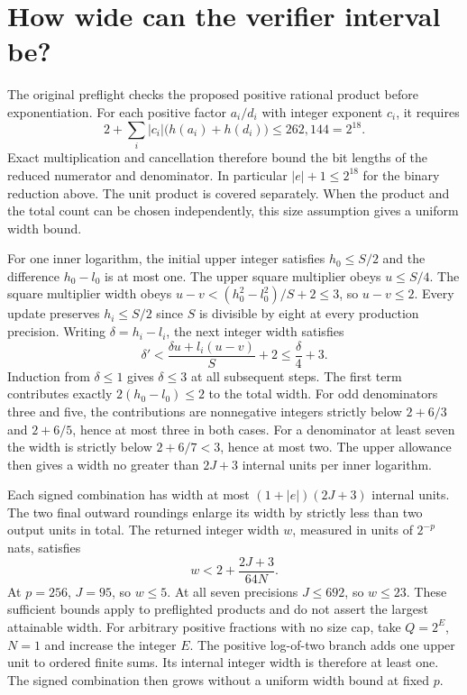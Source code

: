 \clearpage

\section{How wide can the verifier interval be?}\label{how-wide-can-the-verifier-interval-be}

The original preflight checks the proposed positive rational product before exponentiation. For each positive factor \(a_i/d_i\) with integer exponent \(c_i\), it requires \[
2+\sum_i |c_i|\bigl(h(a_i)+h(d_i)\bigr)\le 262{,}144=2^{18}.
\] Exact multiplication and cancellation therefore bound the bit lengths of the reduced numerator and denominator. In particular \(|e|+1\le2^{18}\) for the binary reduction above. The unit product is covered separately. When the product and the total count can be chosen independently, this size assumption gives a uniform width bound.

For one inner logarithm, the initial upper integer satisfies \(h_0\le S/2\) and the difference \(h_0-l_0\) is at most one. The upper square multiplier obeys \(u\le S/4\). The square multiplier width obeys \(u-v<(h_0^2-l_0^2)/S+2\le3\), so \(u-v\le2\). Every update preserves \(h_i\le S/2\) since \(S\) is divisible by eight at every production precision. Writing \(\delta=h_i-l_i\), the next integer width satisfies \[
\delta' < \frac{\delta u+l_i(u-v)}{S}+2\le\frac{\delta}{4}+3.
\] Induction from \(\delta\le1\) gives \(\delta\le3\) at all subsequent steps. The first term contributes exactly \(2(h_0-l_0)\le2\) to the total width. For odd denominators three and five, the contributions are nonnegative integers strictly below \(2+6/3\) and \(2+6/5\), hence at most three in both cases. For a denominator at least seven the width is strictly below \(2+6/7<3\), hence at most two. The upper allowance then gives a width no greater than \(2J+3\) internal units per inner logarithm.

Each signed combination has width at most \((1+|e|)(2J+3)\) internal units. The two final outward roundings enlarge its width by strictly less than two output units in total. The returned integer width \(w\), measured in units of \(2^{-p}\) nats, satisfies \[
w< 2+\frac{2J+3}{64N}.
\] At \(p=256\), \(J=95\), so \(w\le5\). At all seven precisions \(J\le692\), so \(w\le23\). These sufficient bounds apply to preflighted products and do not assert the largest attainable width. For arbitrary positive fractions with no size cap, take \(Q=2^E\), \(N=1\) and increase the integer \(E\). The positive log-of-two branch adds one upper unit to ordered finite sums. Its internal integer width is therefore at least one. The signed combination then grows without a uniform width bound at fixed \(p\).

